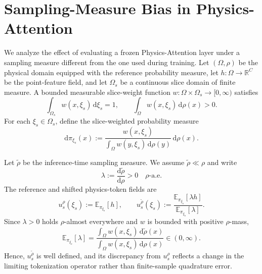 \section{Sampling-Measure Bias in Physics-Attention}
\label{app:measure_shift_bias}

We analyze the effect of evaluating a frozen Physics-Attention layer under a sampling measure different from the one used during training. Let $(\Omega,\rho)$ be the physical domain equipped with the reference probability measure, let $h:\Omega\to\mathbb{R}^{C}$ be the point-feature field, and let $\Omega_s$ be a continuous slice domain of finite measure. A bounded measurable slice-weight function $w:\Omega\times\Omega_s\to[0,\infty)$ satisfies
\begin{equation}
    \int_{\Omega_s}w(x,\xi_s)\,\mathrm{d}\xi_s=1,
    \qquad
    \int_{\Omega}w(x,\xi_s)\,\mathrm{d}\rho(x)>0.
    \label{eq:app_continuous_slice_weights}
\end{equation}
For each $\xi_s\in\Omega_s$, define the slice-weighted probability measure
\begin{equation}
    \mathrm{d}\pi_{\xi_s}(x)
    :=\frac{w(x,\xi_s)}
    {\int_{\Omega}w(y,\xi_s)\,\mathrm{d}\rho(y)}
    \,\mathrm{d}\rho(x).
    \label{eq:app_slice_measure}
\end{equation}

Let $\widetilde{\rho}$ be the inference-time sampling measure. We assume $\widetilde{\rho}\ll\rho$ and write
\begin{equation}
    \lambda:=\frac{\mathrm{d}\widetilde{\rho}}{\mathrm{d}\rho}>0
    \quad \rho\text{-a.e.}
    \label{eq:app_density_ratio}
\end{equation}
The reference and shifted physics-token fields are
\begin{equation}
    u_s^{\rho}(\xi_s)
    :=\mathbb{E}_{\pi_{\xi_s}}[h],
    \qquad
    u_s^{\widetilde{\rho}}(\xi_s)
    :=\frac{\mathbb{E}_{\pi_{\xi_s}}[\lambda h]}
    {\mathbb{E}_{\pi_{\xi_s}}[\lambda]}.
    \label{eq:app_reference_shifted_states}
\end{equation}
Since $\lambda>0$ holds $\rho$-almost everywhere and $w$ is bounded with positive $\rho$-mass,
\[
    \mathbb{E}_{\pi_{\xi_s}}[\lambda]
    =\frac{\int_{\Omega}w(x,\xi_s)\,\mathrm{d}\widetilde{\rho}(x)}
    {\int_{\Omega}w(x,\xi_s)\,\mathrm{d}\rho(x)}
    \in(0,\infty).
\]
Hence, $u_s^{\widetilde{\rho}}$ is well defined, and its discrepancy from $u_s^{\rho}$ reflects a change in the limiting tokenization operator rather than finite-sample quadrature error.


